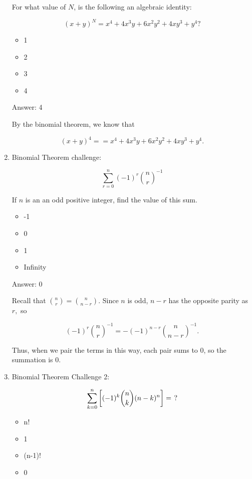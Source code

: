 \documentclass{article}
\begin{document}
\begin{enumerate}
    For what value of  \(N\), is the following an algebraic identity:

     \[ (x+y)^N = x^4 + 4 x^3 y + 6 x^2y^2 + 4 xy^3 + y^4? \]
     
     
     \begin{itemize}
         \item 1
         \item 2
         \item 3
         \item 4
     \end{itemize}
     
     Answer: 4
     
     By the binomial theorem, we know that

     \[ (x+y)^4 = = x^4 + 4 x^3 y + 6 x^2y^2 + 4 xy^3 + y^4. \]
     
     \item Binomial Theorem challenge:
     
      \[
      \sum_{ r=0 }^{ n } { (-1 )}^{ r } {{n}\choose{r}}^{-1} \]
      
      If  \(n\) is an an odd positive integer, find the value of this sum.
     
     \begin{itemize}
         \item -1
         \item 0
         \item 1
         \item Infinity
     \end{itemize}    
     
     Answer: 0
     
     Recall that  \({{n}\choose{r}} = {{n}\choose{n - r}}.\) Since  \(n\) is odd,  \(n-r\) has the opposite parity as  \(r,\) so

     \[{(-1)^r} {{{n}\choose{r}}^{-1}} = -(-1)^{n-r}{{n}\choose{n-r}}^{-1}.\]
    
    Thus, when we pair the terms in this way, each pair sums to 0, so the summation is 0.
    
    \item Binomial Theorem Challenge 2:
    
     \[ \large \sum_{k=0}^n \left[ (-1)^k {{n}\choose{k}} (n-k)^n \right] = \ ? \]
     
     \begin{itemize}
         \item n!
         \item 1
         \item (n-1)!
         \item 0
     \end{itemize}
     

\end{enumerate}
\end{document}
